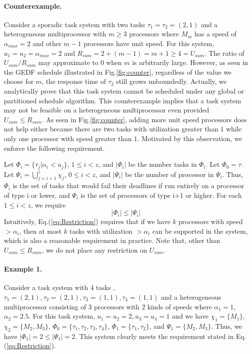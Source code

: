 \documentclass[Times, 10pt,twocolumn]{article}
\theoremstyle{definition}
\begin{document}
\paragraph{Counterexample.} Consider a sporadic task system with two tasks $\tau_1= \tau_2= ( 2, 1)$ and a heterogeneous multiprocessor with $m\geq 3$ processors where $M_m$ has a speed of $\alpha_{max}=2$ and other $m-1$ processors have unit speed. For this system, $u_1= u_2= \alpha_{max}=2$ and $R_{sum}=2+(m-1)=m+1\geq 4=U_{sum}$. The ratio of $U_{sum}/R_{sum}$ may approximate to 0 when $m$ is arbitrarily large. However, as seen in the GEDF schedule illustrated in Fig.\ref{fig:counter}, regardless of the value we choose for $m$, the response time of $\tau_2$ still grows unboundedly. Actually, we analytically prove that this task system cannot be scheduled under any global or partitioned schedule algorithm. This counterexample implies that a task system may not be feasible on a heterogeneous multiprocessor even provided $U_{sum} \leq R_{sum}$. As seen in Fig.\ref{fig:counter}, adding more unit speed processors  does not help either because there are two tasks with utilization greater than $1$ while only one processor with speed greater than $1$. Motivated by this observation, we enforce the following requirement.

Let $\varPhi_i= \{ \tau_j| \alpha_i<  u_j\}$, $1\leq i< z$, and $|\varPhi_i|$ be the number tasks in $\varPhi_i$. Let $\varPhi_0 = \tau$. Let $\Psi_i=\bigcup_{j=i+1}^{z}\chi_j$, $0\leq i< z$,  and $|\Psi_i|$ be the number of processor in $\Psi_i$. Thus, $\Phi_i$ is the set of tasks that would fail their deadlines if run entirely on a processor of type i or lower, and $\Psi_i$ is the set of processors of type i+1 or higher. For each $1\leq i< z$, we require
\begin{equation}
\label{eq:Restriction}
|\varPhi_i|\leq |\Psi_i|
\end{equation}
Intuitively, Eq.(\ref{eq:Restriction}) requires that if we have $k$ processors with speed $> \alpha_i$, then at most $k$ tasks with utilization $> \alpha_i$
can be supported in the system, which is also a reasonable requirement in practice. Note that, other than $U_{sum}\leq R_{sum}$, we do not place any restriction on $U_{sum}$.

\paragraph{Example 1.} Consider a task system with 4 tasks ,$\tau_1=(2, 1), \tau_2=(2, 1),  \tau_3=(1, 1), \tau_4=(1, 1)$ and a heterogeneous multiprocessor consisting of 3 processors with 2 kinds of speeds where $\alpha_1= 1$, $\alpha_2= 2.5$. For this task system, $u_1= u_2= 2, u_3= u_4= 1$ and we have $\chi_1=\{M_1\}$, $\chi_2=\{M_2, M_3\}$,  $\varPhi_0=\{\tau_1, \tau_2, \tau_3, \tau_4\}$, $\varPhi_1=\{\tau_1, \tau_2\}$, and $\Psi_1= \{ M_2, M_3\}$. Thus, we have $|\varPhi_1|= 2 \leq |\Psi_1|= 2$. This system clearly meets the requirement stated in Eq.(\ref{eq:Restriction}). 
\end{document}
